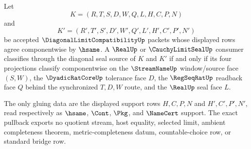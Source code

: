 \begin{theorem}
\label{thm:diagonal-limit-compatibility-four-face-pullback-exactness}
Let
$$
K=(R,T,S,D,W,Q,L,H,C,P,N)
$$
and
$$
K'=(R',T',S',D',W',Q',L',H',C',P',N')
$$
be accepted $\DiagonalLimitCompatibilityUp$ packets whose displayed rows agree
componentwise by $\hsame$. A $\RealUp$ or $\CauchyLimitSealUp$ consumer
classifies through the diagonal seal source of $K$ and $K'$ if and only if its
four projections classify componentwise on the $\StreamNameUp$ window/source
face $(S,W)$, the $\DyadicRatCoreUp$ tolerance face $D$, the $\RegSeqRatUp$
readback face $Q$ behind the synchronized $T,D,W$ route, and the $\RealUp$ seal
face $L$.

The only gluing data are the displayed support rows $H,C,P,N$ and
$H',C',P',N'$, read respectively as $\hsame$, $\Cont$, $\Pkg$, and $\NameCert$
support. The exact pullback exports no quotient stream, host equality, selected
limit, ambient completeness theorem, metric-completeness datum, countable-choice
row, or standard bridge row.
\end{theorem}
